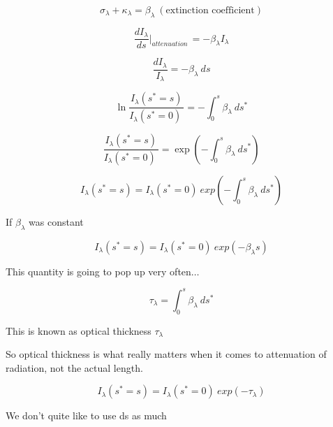 \documentclass[12pt]{article}
\renewcommand{\_}{\kern-1.5pt\textunderscore\kern-1.5pt}
\begin{document}
 \[  \sigma _{ \lambda }+ \kappa _{ \lambda }= \beta _{ \lambda }~ \left( \text{extinction coefficient} \right)  \] \par

 \[ \frac{dI_{ \lambda }}{ds}\vert _{attenuation~}=- \beta _{ \lambda }I_{ \lambda } \] \par

 \[ \frac{dI_{ \lambda }}{I_{ \lambda }}=- \beta _{ \lambda }~ds \] \par

 \[ \ln \frac{I_{ \lambda }  \left( s^{\ast}=s \right) }{I_{ \lambda } \left( s^{\ast}=0 \right) ~}=- \int _{0}^{s} \beta _{ \lambda }~ds^{\ast} \] \par

 \[ \frac{I_{ \lambda }  \left( s^{\ast}=s \right) }{I_{ \lambda } \left( s^{\ast}=0 \right) ~}=\exp  \left( - \int _{0}^{s} \beta _{ \lambda }~ds^{\ast} \right)  \] \par

 \[ I_{ \lambda }  \left( s^{\ast}=s \right) =I_{ \lambda } \left( s^{\ast}=0 \right) ~exp \left( - \int _{0}^{s} \beta _{ \lambda }~ds^{\ast} \right)  \] \par

If  \(  \beta _{ \lambda } \)  was constant\par

 \[ I_{ \lambda }  \left( s^{\ast}=s \right) =I_{ \lambda } \left( s^{\ast}=0 \right) ~exp \left( - \beta _{ \lambda }s \right)  \] \par

This quantity is going to pop up very often$ \ldots $ \par

 \[  \tau_{ \lambda }= \int _{0}^{s} \beta _{ \lambda }~ds^{\ast} \] \par

\par

This is known as optical thickness  \(  \tau_{ \lambda } \) \par

So optical thickness is what really matters when it comes to attenuation of radiation, not the actual length.\par

 \[ I_{ \lambda }  \left( s^{\ast}=s \right) =I_{ \lambda } \left( s^{\ast}=0 \right) ~exp \left( - \tau_{ \lambda } \right)  \] \par

We don’t quite like to use ds as much\par
\end{document}
